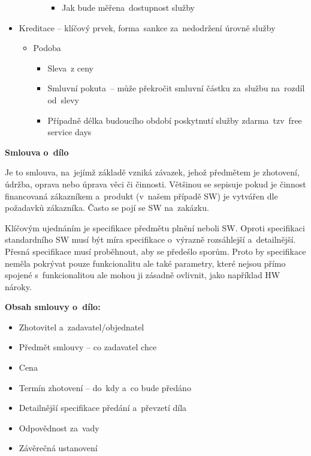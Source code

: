 \begin{itemize}
\begin{itemize}
\begin{itemize}
			\begin{itemize} 
				\item Jak bude měřena~dostupnost služby
			\end{itemize}
		\end{itemize}
	\end{itemize}
	\item Kreditace -- klíčový prvek, forma~sankce za~nedodržení úrovně služby
	\begin{itemize} 
		\item Podoba
		\begin{itemize} 
			\item Sleva~z ceny
			\item Smluvní pokuta~-- může překročit smluvní částku za~službu na~rozdíl od~slevy
			\item Případně délka budoucího období poskytnutí služby zdarma~tzv~free service days
		\end{itemize}
	\end{itemize}
\end{itemize}

\begin{Large}
\textbf{Smlouva o~dílo}
\end{Large}

Je to smlouva, na~jejímž základě vzniká závazek, jehož předmětem je zhotovení, údržba, oprava nebo úprava věci či činnosti. Většinou se sepisuje pokud je činnost financovaná zákazníkem a~produkt (v~našem případě SW) je vytvářen dle požadavků zákazníka. Často se pojí se SW na~zakázku.

Klíčovým ujednáním je specifikace předmětu plnění neboli SW\@. Oproti specifikaci standardního SW musí být míra specifikace o~výrazně rozsáhlejší a~detailnější. Přesná specifikace musí proběhnout, aby se předešlo sporům. Proto by specifikace neměla pokrývat pouze funkcionalitu ale také parametry, které nejsou přímo spojené s~funkcionalitou ale mohou ji zásadně ovlivnit, jako například HW nároky.

\vspace{1cm}
\textbf{Obsah smlouvy o~dílo:}
\begin{itemize} 
	\item Zhotovitel a~zadavatel/objednatel
	\item Předmět smlouvy -- co zadavatel chce
	\item Cena
	\item Termín zhotovení -- do~kdy a~co bude předáno
	\item Detailnější specifikace předání a~převzetí díla
	\item Odpovědnost za~vady
	\item Závěrečná ustanovení
\end{itemize}

